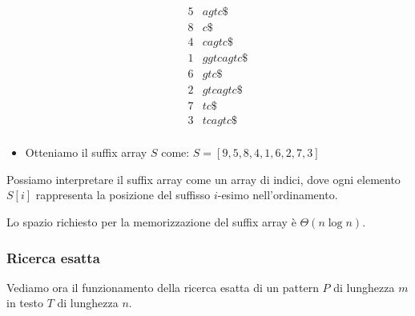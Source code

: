 \begin{esempio}
\begin{itemize}
\begin{equation}
\begin{array}{c|l}
                      5 & agtc\$     \\
                      8 & c\$        \\
                      4 & cagtc\$    \\
                      1 & ggtcagtc\$ \\
                      6 & gtc\$      \\
                      2 & gtcagtc\$  \\
                      7 & tc\$       \\
                      3 & tcagtc\$   \\
                  \end{array}
              \end{equation}
        \item Otteniamo il suffix array $S$ come: $S = [9, 5, 8, 4, 1, 6, 2, 7, 3]$
    \end{itemize}
\end{esempio}
Possiamo interpretare il suffix array come un array di indici, dove ogni elemento
$S[i]$ rappresenta la posizione del suffisso $i$-esimo nell'ordinamento.

Lo spazio richiesto per la memorizzazione del suffix array è $\Theta(n \log n)$.
\subsubsection{Ricerca esatta}
Vediamo ora il funzionamento della ricerca esatta di un pattern $P$ di lunghezza
$m$ in testo $T$ di lunghezza $n$.

